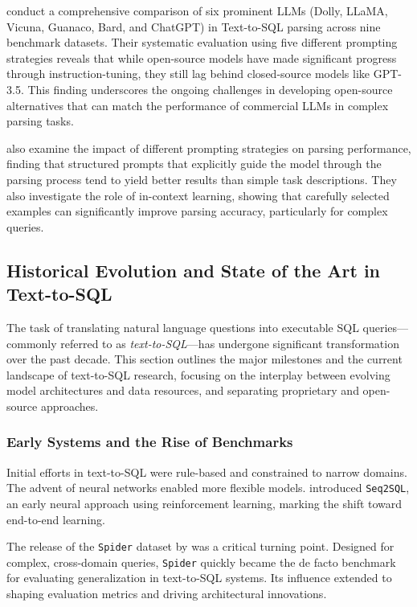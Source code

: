 \citet{sun-etal-2023-battle} conduct a comprehensive comparison of six prominent LLMs (Dolly, LLaMA, Vicuna, Guanaco, Bard, and ChatGPT) in Text-to-SQL parsing across nine benchmark datasets. Their systematic evaluation using five different prompting strategies reveals that while open-source models have made significant progress through instruction-tuning, they still lag behind closed-source models like GPT-3.5. This finding underscores the ongoing challenges in developing open-source alternatives that can match the performance of commercial LLMs in complex parsing tasks.

\citet{liu2023llm} also examine the impact of different prompting strategies on parsing performance, finding that structured prompts that explicitly guide the model through the parsing process tend to yield better results than simple task descriptions. They also investigate the role of in-context learning, showing that carefully selected examples can significantly improve parsing accuracy, particularly for complex queries.

\subsection{Historical Evolution and State of the Art in Text-to-SQL}

The task of translating natural language questions into executable SQL queries---commonly referred to as \emph{text-to-SQL}---has undergone significant transformation over the past decade. This section outlines the major milestones and the current landscape of text-to-SQL research, focusing on the interplay between evolving model architectures and data resources, and separating proprietary and open-source approaches.

\subsubsection{Early Systems and the Rise of Benchmarks}

Initial efforts in text-to-SQL were rule-based and constrained to narrow domains. The advent of neural networks enabled more flexible models. \citet{zhong2017seq2sql} introduced \texttt{Seq2SQL}, an early neural approach using reinforcement learning, marking the shift toward end-to-end learning.

The release of the \texttt{Spider} dataset by \citet{yu2018spider} was a critical turning point. Designed for complex, cross-domain queries, \texttt{Spider} quickly became the de facto benchmark for evaluating generalization in text-to-SQL systems. Its influence extended to shaping evaluation metrics and driving architectural innovations.


